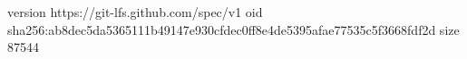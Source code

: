 version https://git-lfs.github.com/spec/v1
oid sha256:ab8dec5da5365111b49147e930cfdec0ff8e4de5395afae77535c5f3668fdf2d
size 87544
